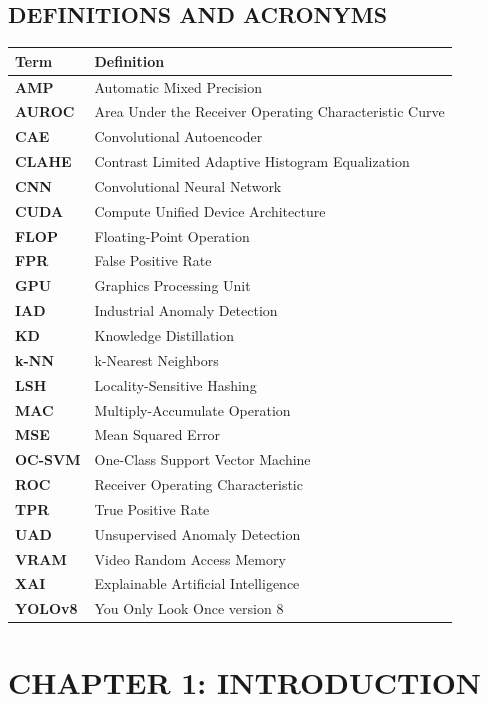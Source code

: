\subsection{DEFINITIONS AND ACRONYMS}\label{definitions-and-acronyms}

\begin{longtable}[]{@{}ll@{}}
\toprule\noalign{}
Term & Definition \\
\midrule\noalign{}
\endhead
\bottomrule\noalign{}
\endlastfoot
\textbf{AMP} & Automatic Mixed Precision \\
\textbf{AUROC} & Area Under the Receiver Operating Characteristic Curve \\
\textbf{CAE} & Convolutional Autoencoder \\
\textbf{CLAHE} & Contrast Limited Adaptive Histogram Equalization \\
\textbf{CNN} & Convolutional Neural Network \\
\textbf{CUDA} & Compute Unified Device Architecture \\
\textbf{FLOP} & Floating-Point Operation \\
\textbf{FPR} & False Positive Rate \\
\textbf{GPU} & Graphics Processing Unit \\
\textbf{IAD} & Industrial Anomaly Detection \\
\textbf{KD} & Knowledge Distillation \\
\textbf{k-NN} & k-Nearest Neighbors \\
\textbf{LSH} & Locality-Sensitive Hashing \\
\textbf{MAC} & Multiply-Accumulate Operation \\
\textbf{MSE} & Mean Squared Error \\
\textbf{OC-SVM} & One-Class Support Vector Machine \\
\textbf{ROC} & Receiver Operating Characteristic \\
\textbf{TPR} & True Positive Rate \\
\textbf{UAD} & Unsupervised Anomaly Detection \\
\textbf{VRAM} & Video Random Access Memory \\
\textbf{XAI} & Explainable Artificial Intelligence \\
\textbf{YOLOv8} & You Only Look Once version 8 \\
\end{longtable}

\section{CHAPTER 1: INTRODUCTION}\label{chapter-1-introduction}

